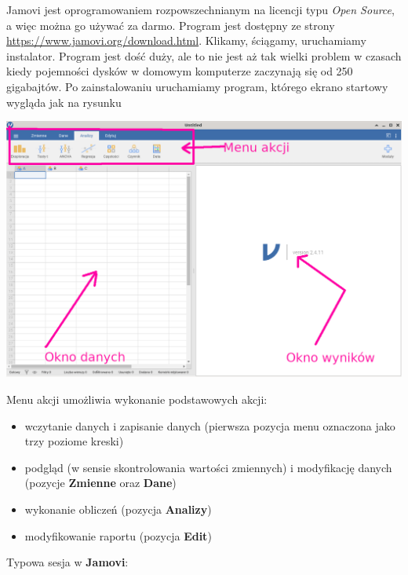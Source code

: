 \documentclass[
  openany]{book}
\begin{document}
Jamovi jest oprogramowaniem rozpowszechnianym na licencji typu \emph{Open Source},
a więc można go używać za darmo. Program jest dostępny ze strony
\url{https://www.jamovi.org/download.html}. Klikamy, ściągamy, uruchamiamy instalator.
Program jest dość duży, ale to nie jest aż tak wielki problem w czasach kiedy
pojemności dysków w domowym komputerze zaczynają się od 250 gigabajtów.
Po zainstalowaniu uruchamiamy program, którego ekrano startowy wygląda jak
na rysunku

\includegraphics{./jamovi_main_screen.png}

Menu akcji umożliwia wykonanie podstawowych akcji:

\begin{itemize}
\item
  wczytanie danych i zapisanie danych (pierwsza pozycja menu oznaczona jako
  trzy poziome kreski)
\item
  podgląd (w sensie skontrolowania wartości zmiennych) i modyfikację
  danych (pozycje \textbf{Zmienne} oraz \textbf{Dane})
\item
  wykonanie obliczeń (pozycja \textbf{Analizy})
\item
  modyfikowanie raportu (pozycja \textbf{Edit})
\end{itemize}

Typowa sesja w \textbf{Jamovi}:
\end{document}
